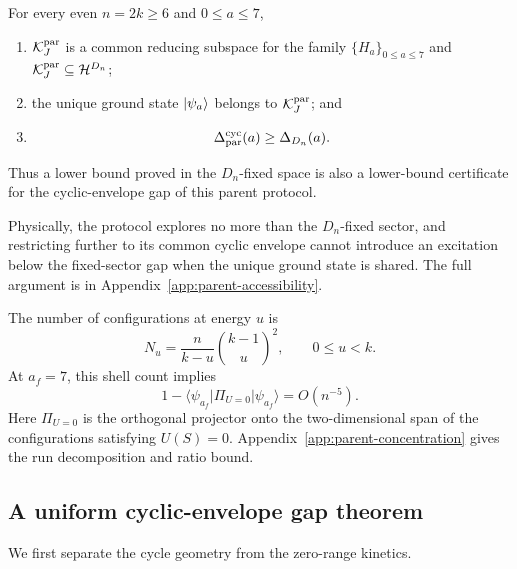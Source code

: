 \begin{proposition}
\label{prop:parent-cyclic-accessibility}
For every even $n=2k\geq6$ and $0\leq a\leq7$,
\begin{enumerate}
 \item $\mathcal K_J^{\rm par}$ is a common reducing subspace for the
 family $\{H_a\}_{0\leq a\leq7}$ and
 $\mathcal K_J^{\rm par}\subseteq\mathcal H^{D_n}$;
 \item the unique ground state $\lvert\psi_a\rangle$ belongs to
 $\mathcal K_J^{\rm par}$; and
 \item
 \begin{equation}
  \Delta_{\rm par}^{\rm cyc}(a)\geq\Delta_{D_n}(a).
  \label{eq:parent-cyclic-fixed-comparison}
 \end{equation}
\end{enumerate}
Thus a lower bound proved in the $D_n$-fixed space is also a lower-bound
certificate for the cyclic-envelope gap of this parent protocol.
\end{proposition}

Physically, the protocol explores no more than the $D_n$-fixed sector, and
restricting further to its common cyclic envelope cannot introduce an excitation
below the fixed-sector gap when the unique ground state is shared.  The full
argument is in Appendix~\ref{app:parent-accessibility}.

The number of configurations at energy $u$ is
\begin{equation}
 N_u=\frac{n}{k-u}\binom{k-1}{u}^2,
 \qquad 0\leq u<k.
 \label{eq:cycle-shell-count}
\end{equation}
At $a_f=7$, this shell count implies
\begin{equation}
 1-\langle\psi_{a_f}|\Pi_{U=0}|\psi_{a_f}\rangle
 =O(n^{-5}).
 \label{eq:cycle-endpoint-concentration}
\end{equation}
Here $\Pi_{U=0}$ is the orthogonal projector onto the two-dimensional span
of the configurations satisfying $U(S)=0$.
Appendix~\ref{app:parent-concentration} gives the run decomposition and
ratio bound.

\subsection{A uniform cyclic-envelope gap theorem}

We first separate the cycle geometry from the zero-range kinetics.

